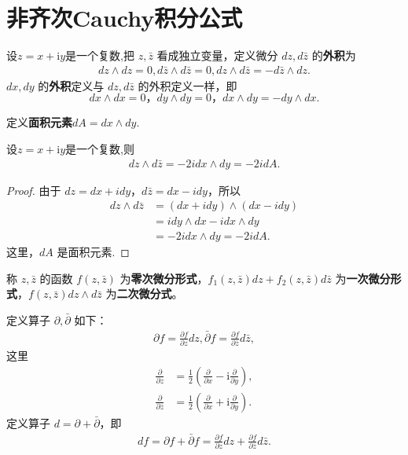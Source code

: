 \documentclass[../../main.tex]{subfiles}
\begin{document}
\section{非齐次Cauchy积分公式}

\begin{definition}
设$z=x+\mathrm{i}y$是一个复数,把 \( z,\bar{z} \) 看成独立变量，定义微分 \( dz,d\bar{z} \) 的\textbf{外积}为
\begin{align*}
dz \wedge dz = 0, 
d\bar{z} \wedge d\bar{z} = 0, 
dz \wedge d\bar{z} = -d\bar{z} \wedge dz.
\end{align*}
\( dx,dy \) 的\textbf{外积}定义与 \( dz,d\bar{z} \) 的外积定义一样，即 
\[
dx \wedge dx = 0 ， dy \wedge dy = 0 ， dx \wedge dy = -dy \wedge dx .
\]

定义\textbf{面积元素}\( dA =dx \wedge dy .\) 
\end{definition}

\begin{proposition}
设$z=x+\mathrm{i}y$是一个复数,则
\begin{align*}
dz \wedge d\bar{z} = -2idx \wedge dy = -2idA.
\end{align*}
\end{proposition}
\begin{proof}
由于 \( dz = dx + idy \)，\( d\bar{z} = dx - idy \)，所以
\begin{align*}
dz \wedge d\bar{z} &= (dx + idy) \wedge (dx - idy) \\
&= idy \wedge dx - idx \wedge dy \\
&= -2idx \wedge dy = -2idA.
\end{align*}
这里，\( dA \) 是面积元素.
\end{proof}

\begin{definition}
称 \( z,\bar{z} \) 的函数 \( f(z,\bar{z}) \) 为\textbf{零次微分形式}，\( f_1(z,\bar{z})dz + f_2(z,\bar{z})d\bar{z} \) 为\textbf{一次微分形式}，\( f(z,\bar{z})dz \wedge d\bar{z} \) 为\textbf{二次微分式}。
\end{definition}

\begin{definition}
定义算子 \( \partial,\bar{\partial} \) 如下：
\begin{align*}
\partial f = \frac{\partial f}{\partial z}dz, 
\bar{\partial} f = \frac{\partial f}{\partial \bar{z}}d\bar{z},
\end{align*}
这里
\begin{align*}
\frac{\partial}{\partial z} &= \frac{1}{2}\left( \frac{\partial}{\partial x} - \text{i}\frac{\partial}{\partial y} \right), \\
\frac{\partial}{\partial \overline{z}} &= \frac{1}{2}\left( \frac{\partial}{\partial x} + \text{i}\frac{\partial}{\partial y} \right).
\end{align*}
定义算子 \( d = \partial + \bar{\partial} \)，即
\begin{align}
df = \partial f + \bar{\partial} f = \frac{\partial f}{\partial z}dz + \frac{\partial f}{\partial \bar{z}}d\bar{z}. \label{eq:1}
\end{align}
\end{definition}
\end{document}
